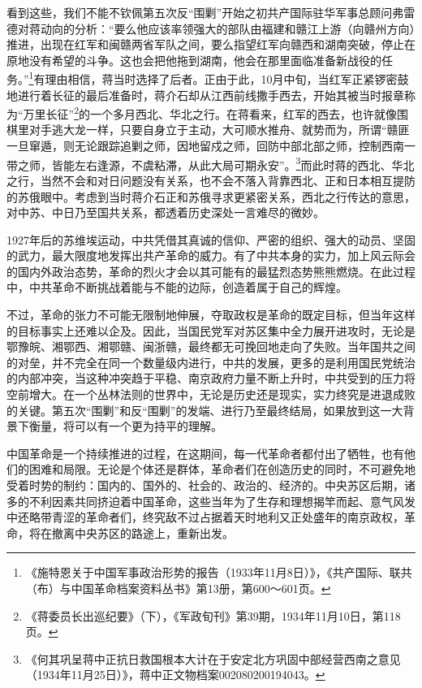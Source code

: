 看到这些，我们不能不钦佩第五次反“围剿”开始之初共产国际驻华军事总顾问弗雷德对蒋动向的分析：“要么他应该率领强大的部队由福建和赣江上游（向赣州方向）推进，出现在红军和闽赣两省军队之间，要么指望红军向赣西和湖南突破，停止在原地没有希望的斗争。这也会把他拖到湖南，他会在那里面临准备新战役的任务。”\footnote{《施特恩关于中国军事政治形势的报告（1933年11月8日）》，《共产国际、联共（布）与中国革命档案资料丛书》第13册，第600～601页。}有理由相信，蒋当时选择了后者。正由于此，10月中旬，当红军正紧锣密鼓地进行着长征的最后准备时，蒋介石却从江西前线撒手西去，开始其被当时报章称为“万里长征”\footnote{《蒋委员长出巡纪要》（下），《军政旬刊》第39期，1934年11月10日，第118页。}的一个多月西北、华北之行。在蒋看来，红军的西去，也许就像围棋里对手逃大龙一样，只要自身立于主动，大可顺水推舟、就势而为，所谓“赣匪一旦窜遁，则无论跟踪追剿之师，因地留戍之师，回防中部北部之师，控制西南一带之师，皆能左右逢源，不虞粘滞，从此大局可期永安”。\footnote{《何其巩呈蒋中正抗日救国根本大计在于安定北方巩固中部经营西南之意见（1934年11月25日）》，蒋中正文物档案002080200194043。}而此时蒋的西北、华北之行，当然不会和对日问题没有关系，也不会不落入背靠西北、正和日本相互提防的苏俄眼中。考虑到当时蒋介石正和苏俄寻求更紧密关系，西北之行传达的意思，对中苏、中日乃至国共关系，都透着历史深处一言难尽的微妙。


1927年后的苏维埃运动，中共凭借其真诚的信仰、严密的组织、强大的动员、坚固的武力，最大限度地发挥出共产革命的威力。有了中共本身的实力，加上风云际会的国内外政治态势，革命的烈火才会以其可能有的最猛烈态势熊熊燃烧。在此过程中，中共革命不断挑战着能与不能的边际，创造着属于自己的辉煌。


不过，革命的张力不可能无限制地伸展，夺取政权是革命的既定目标，但当年这样的目标事实上还难以企及。因此，当国民党军对苏区集中全力展开进攻时，无论是鄂豫皖、湘鄂西、湘鄂赣、闽浙赣，最终都无可挽回地走向了失败。当年国共之间的对垒，并不完全在同一个数量级内进行，中共的发展，更多的是利用国民党统治的内部冲突，当这种冲突趋于平稳、南京政府力量不断上升时，中共受到的压力将空前增大。在一个丛林法则的世界中，无论是历史还是现实，实力终究是进退成败的关键。第五次“围剿”和反“围剿”的发端、进行乃至最终结局，如果放到这一大背景下衡量，将可以有一个更为持平的理解。


中国革命是一个持续推进的过程，在这期间，每一代革命者都付出了牺牲，也有他们的困难和局限。无论是个体还是群体，革命者们在创造历史的同时，不可避免地受着时势的制约：国内的、国外的、社会的、政治的、经济的。中央苏区后期，诸多的不利因素共同挤迫着中国革命，这些当年为了生存和理想揭竿而起、意气风发中还略带青涩的革命者们，终究敌不过占据着天时地利又正处盛年的南京政权，革命，将在撤离中央苏区的路途上，重新出发。

